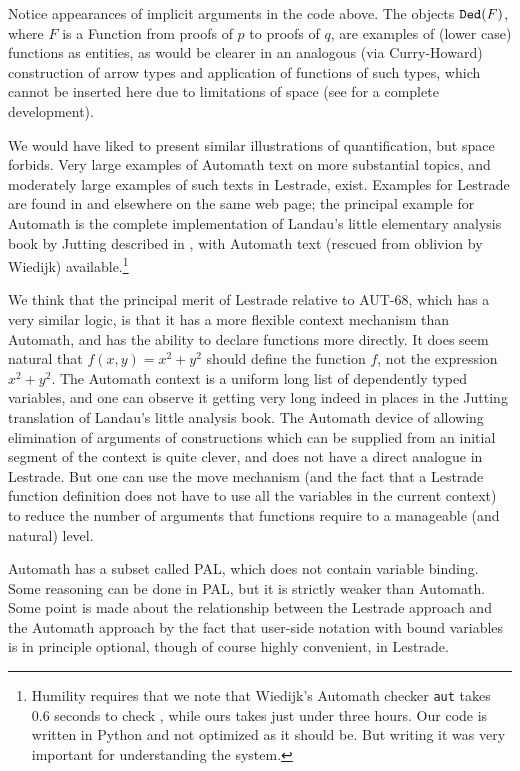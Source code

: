 \documentclass[submission,copyright,creativecommons]{eptcs}
\begin{document}
  Notice appearances of implicit arguments in the code above.  The objects
${\tt Ded}(F)$, where $F$ is a Function from proofs of $p$ to proofs of $q$, are examples of (lower case) functions as entities, as would be clearer in an analogous (via Curry-Howard) construction of arrow types and application of functions of such types, which cannot be inserted here due to limitations of space (see \cite{lestrademanual} for a complete development).

We would have liked to present similar illustrations of quantification, but space forbids.  Very large examples of Automath text on more substantial topics, and moderately large examples of such texts in Lestrade, exist.  Examples for Lestrade are found in \cite{lestrademanual} and elsewhere on the same web page;  the principal example for Automath is the complete implementation of Landau's little elementary analysis book \cite{landau} by Jutting described in \cite{juttingd}, with Automath text \cite{grundlagen} (rescued from oblivion by Wiedijk) available.\footnote{Humility requires that we note that Wiedijk's Automath checker {\tt aut} takes 0.6 seconds to check \cite{grundlagen}, while ours takes just under three hours.  Our code is written in Python and not optimized as it should be.  But writing it was very important for understanding the system.}

We think that the principal merit of Lestrade relative to AUT-68, which has a very similar logic, is that it has a more flexible context mechanism than Automath, and has the ability to declare functions more directly.  It does seem natural that $f(x,y)=x^2+y^2$ should define the function $f$, not the expression $x^2+y^2$.   The Automath context is a uniform long list of dependently typed variables, and one can observe it getting very long indeed in places in the Jutting translation of Landau's little analysis book.  The Automath device of allowing elimination of arguments of constructions which can be supplied from an initial segment of the context is quite clever, and does not have a direct analogue in Lestrade.  But one can use the move mechanism (and the fact that a Lestrade function definition does not have to use all the variables in the current context)  to reduce the number of arguments that functions require to a manageable (and natural) level.

Automath has a subset called PAL, which does not contain variable binding.  Some reasoning can be done in PAL, but it is strictly weaker than Automath.
Some point is made about the relationship between the Lestrade approach and the Automath approach by the fact that user-side notation with bound variables is in principle optional, though of course highly convenient, in Lestrade.
\end{document}
